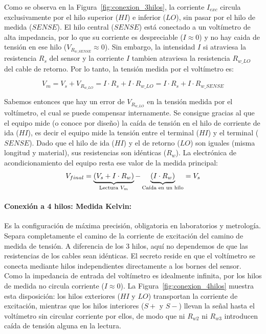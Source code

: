 Como se observa en la Figura~\ref{fig:conexion_3hilos}, la corriente $I_{exc}$ circula exclusivamente por el hilo superior ($HI$) e inferior ($LO$), sin pasar por el hilo de medida ($SENSE$). El hilo central ($SENSE$) está conectado a un voltímetro de alta impedancia, por lo que su corriente es despreciable ($I \approx 0$) y no hay caida de tensión en ese hilo ($V_{R_{w\_SENSE}} \approx 0$). Sin embargo, la intensidad $I$ si atraviesa la resistencia $R_s$ del sensor y la corriente $I$ tambien atraviesa la resistencia $R_{w\_LO}$ del cable de retorno. Por lo tanto, la tensión medida por el voltímetro es:

\begin{equation}
V_m = V_s + V_{R_{w\_LO}} = I \cdot R_s + I \cdot R_{w\_LO} = I \cdot R_s + I \cdot R_{w\_SENSE}
\end{equation}

Sabemos entonces que hay un error de $V_{R_{w\_LO}}$ en la tensión medida por el voltímetro, el cual se puede compensar internamente. Se consigue gracias al que el equipo mide (o conoce por diseño) la caída de tensión en el hilo de corriente de ida ($HI$), es decir el equipo mide la tensión entre el terminal ($HI$) y el terminal ($SENSE$). Dado que el hilo de ida ($HI$) y el de retorno ($LO$) son iguales (misma longitud y material), sus resistencias son idénticas ($R_w$). La electrónica de acondicionamiento del equipo resta ese valor de la medida principal:
\begin{equation}
V_{final} = \underbrace{(V_s + I \cdot R_w)}_{\text{\scriptsize Lectura } V_m} - \underbrace{(I \cdot R_w \mathstrut)}_{\text{\scriptsize Caída en un hilo}} = V_s
\end{equation}

\paragraph{Conexión a 4 hilos: Medida Kelvin:}

Es la configuración de máxima precisión, obligatoria en laboratorios y metrología. Separa completamente el camino de la corriente de excitación del camino de medida de tensión. A diferencia de los 3 hilos, aquí no dependemos de que las resistencias de los cables sean idénticas. El secreto reside en que el voltímetro se conecta mediante hilos independientes directamente a los bornes del sensor. Como la impedancia de entrada del voltímetro es idealmente infinita, por los hilos de medida no circula corriente ($I \approx0$). La Figura~\ref{fig:conexion_4hilos} muestra esta disposición: los hilos exteriores ($HI$ y $LO$) transportan la corriente de excitación, mientras que los hilos interiores ($S+$ y $S-$) llevan la señal hasta el voltímetro sin circular corriente por ellos, de modo que ni $R_{w2}$ ni $R_{w3}$ introducen caída de tensión alguna en la lectura.


